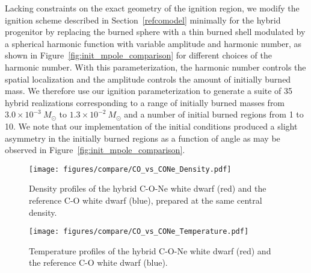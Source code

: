 \documentclass[iop,apj]{emulateapj}
\newcommand{\figref}[1]{Figure~\ref{#1}}
\newcommand{\secref}[1]{Section~\ref{#1}}
\newcommand{\Msun}{\ensuremath{M_\odot}}
\begin{document}
Lacking constraints on the exact geometry of the ignition region, we
modify the ignition scheme described in \secref{refcomodel} minimally
for the hybrid progenitor by replacing the burned sphere with a thin
burned shell modulated by a spherical harmonic function with variable
amplitude and harmonic number, as shown in
\figref{fig:init_mpole_comparison} for different choices of the
harmonic number.  With this parameterization, the harmonic number
controls the spatial localization and the amplitude controls the
amount of initially burned mass.  We therefore use our ignition
parameterization to generate a suite of 35 hybrid realizations
corresponding to a range of initially burned masses from $3.0\times
10^{-3}~\Msun$ to $1.3\times 10^{-2}~\Msun$ and a number of initial
burned regions from 1 to 10. We note that our implementation of 
the initial conditions produced a slight asymmetry in the initially burned
regions as a function of angle as may be observed in \figref{fig:init_mpole_comparison}.

\begin{figure}[!ht]
	\texttt{[image: figures/compare/CO\_vs\_CONe\_Density.pdf]}
	\caption{\label{fig:co_vs_cone_density} Density profiles of the hybrid C-O-Ne white dwarf (red) and the reference C-O white dwarf (blue), prepared at the same central density.}
\end{figure}

\begin{figure}[!ht]
	\texttt{[image: figures/compare/CO\_vs\_CONe\_Temperature.pdf]}
	\caption{\label{fig:co_vs_cone_temp} Temperature profiles of the hybrid C-O-Ne white dwarf (red) and the reference C-O white dwarf (blue).}
\end{figure}
\end{document}
